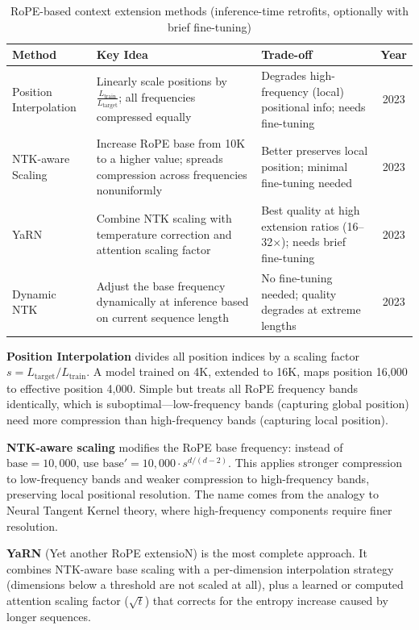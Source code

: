 \begin{table}[H]
\centering
\caption{RoPE-based context extension methods (inference-time retrofits, optionally with brief fine-tuning)}
\begin{tabularx}{\textwidth}{lXXc}
\toprule
\textbf{Method} & \textbf{Key Idea} & \textbf{Trade-off} & \textbf{Year} \\
\midrule
Position Interpolation & Linearly scale positions by $\frac{L_{\text{train}}}{L_{\text{target}}}$; all frequencies compressed equally & Degrades high-frequency (local) positional info; needs fine-tuning & 2023 \\
NTK-aware Scaling & Increase RoPE base from 10K to a higher value; spreads compression across frequencies nonuniformly & Better preserves local position; minimal fine-tuning needed & 2023 \\
YaRN & Combine NTK scaling with temperature correction and attention scaling factor & Best quality at high extension ratios (16--32$\times$); needs brief fine-tuning & 2023 \\
Dynamic NTK & Adjust the base frequency dynamically at inference based on current sequence length & No fine-tuning needed; quality degrades at extreme lengths & 2023 \\
\bottomrule
\end{tabularx}
\end{table}

\textbf{Position Interpolation} divides all position indices by a scaling factor $s = L_{\text{target}} / L_{\text{train}}$. A model trained on 4K, extended to 16K, maps position 16,000 to effective position 4,000. Simple but treats all RoPE frequency bands identically, which is suboptimal---low-frequency bands (capturing global position) need more compression than high-frequency bands (capturing local position).

\textbf{NTK-aware scaling} modifies the RoPE base frequency: instead of $\text{base} = 10{,}000$, use $\text{base}' = 10{,}000 \cdot s^{d/(d-2)}$. This applies stronger compression to low-frequency bands and weaker compression to high-frequency bands, preserving local positional resolution. The name comes from the analogy to Neural Tangent Kernel theory, where high-frequency components require finer resolution.

\textbf{YaRN} (Yet another RoPE extensioN) is the most complete approach. It combines NTK-aware base scaling with a per-dimension interpolation strategy (dimensions below a threshold are not scaled at all), plus a learned or computed attention scaling factor ($\sqrt{t}$) that corrects for the entropy increase caused by longer sequences.

